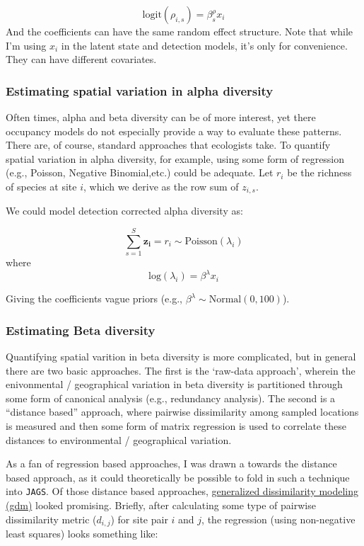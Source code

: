 \documentclass[
]{article}
\begin{document}
\[\text{logit}(\rho_{i,s}) = \beta_s^\rho x_i\] And the coefficients can
have the same random effect structure. Note that while I'm using \(x_i\)
in the latent state and detection models, it's only for convenience.
They can have different covariates.

\hypertarget{estimating-spatial-variation-in-alpha-diversity}{%
\subsubsection{Estimating spatial variation in alpha
diversity}\label{estimating-spatial-variation-in-alpha-diversity}}

Often times, alpha and beta diversity can be of more interest, yet there
occupancy models do not especially provide a way to evaluate these
patterns. There are, of course, standard approaches that ecologists
take. To quantify spatial variation in alpha diversity, for example,
using some form of regression (e.g., Poisson, Negative Binomial,etc.)
could be adequate. Let \(r_i\) be the richness of species at site \(i\),
which we derive as the row sum of \(z_{i,s}\).

We could model detection corrected alpha diversity as:

\[  \sum_{s = 1}^S\boldsymbol{z_i} =  r_i \sim \text{Poisson}(\lambda_i)\]
where \[\text{log}(\lambda_i) = \beta^\lambda x_i\]

Giving the coefficients vague priors (e.g.,
\(\beta^\lambda \sim \text{Normal}(0, 100)\)).

\hypertarget{estimating-beta-diversity}{%
\subsubsection{Estimating Beta
diversity}\label{estimating-beta-diversity}}

Quantifying spatial varition in beta diversity is more complicated, but
in general there are two basic approaches. The first is the `raw-data
approach', wherein the enivonmental / geographical variation in beta
diversity is partitioned through some form of canonical analysis (e.g.,
redundancy analysis). The second is a ``distance based'' approach, where
pairwise dissimilarity among sampled locations is measured and then some
form of matrix regression is used to correlate these distances to
environmental / geographical variation.

As a fan of regression based approaches, I was drawn a towards the
distance based approach, as it could theoretically be possible to fold
in such a technique into \texttt{JAGS}. Of those distance based
approaches,
\href{https://onlinelibrary.wiley.com/doi/10.1111/j.1472-4642.2007.00341.x}{generalized
dissimilarity modeling (gdm)} looked promising. Briefly, after
calculating some type of pairwise dissimilarity metric (\(d_{i,j}\)) for
site pair \(i\) and \(j\), the regression (using non-negative least
squares) looks something like:
\end{document}
